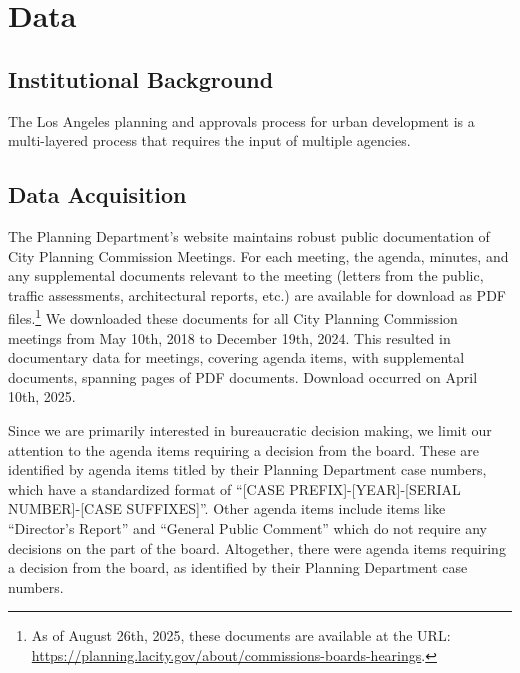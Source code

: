 \section{Data}\label{sec_data}

\subsection{Institutional Background}

The Los Angeles planning and approvals process for urban development is a multi-layered process that requires the input of multiple agencies. 

\subsection{Data Acquisition}

The Planning Department's website maintains robust public documentation of City Planning Commission Meetings. For each meeting, the agenda, minutes, and any supplemental documents relevant to the meeting (letters from the public, traffic assessments, architectural reports, etc.) are available for download as PDF files.\footnote{As of August 26th, 2025, these documents are available at the URL: \url{https://planning.lacity.gov/about/commissions-boards-hearings}.} We downloaded these documents for all City Planning Commission meetings from May 10th, 2018 to December 19th, 2024. This resulted in documentary data for  meetings, covering  agenda items, with  supplemental documents, spanning  pages of PDF documents. Download occurred on April 10th, 2025.

Since we are primarily interested in bureaucratic decision making, we limit our attention to the agenda items requiring a decision from the board. These are identified by agenda items titled by their Planning Department case numbers, which have a standardized format of ``[CASE PREFIX]-[YEAR]-[SERIAL NUMBER]-[CASE SUFFIXES]''. Other agenda items include items like ``Director's Report'' and ``General Public Comment'' which do not require any decisions on the part of the board. Altogether, there were  agenda items requiring a decision from the board, as identified by their Planning Department case numbers.

